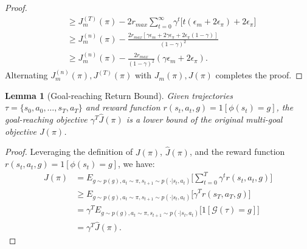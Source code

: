 \documentclass{article}
\newtheorem{lemma}{Lemma}
\begin{document}
\begin{proof}
\begin{equation*}
\begin{aligned}
    &\geq J^{(T)}_m(\pi) - 2r_{max}\sum_{t=0}^{\infty} \gamma^t\big[ t(\epsilon_m +2\epsilon_{\pi}) + 2\epsilon_{\pi} \big] \\
    &\geq J^{(n)}_m(\pi) - \frac{2 r_{max}[\gamma\epsilon_m + 2 \gamma \epsilon_{\pi}+2\epsilon_{\pi}(1-\gamma)]}{(1-\gamma)^2} \\
    &\geq J_m^{(n)}(\pi) - \frac{2r_{max}}{(1-\gamma)^2} ( \gamma \epsilon_m + 2\epsilon_{\pi}  ).
    \end{aligned}
    \end{equation*}
    Alternating $J_m^{(n)}(\pi), J^{(T)}(\pi)$ with $J_m(\pi), J(\pi)$ completes the proof.
\end{proof}

\begin{lemma}[Goal-reaching Return Bound]
\label{lemma1}
    Given trajectories $\tau = \{s_0,a_0,\ldots, s_T, a_T\}$ and reward function $r(s_t,a_t,g) = 1[\phi(s_t) = g]$, the goal-reaching objective $\gamma^T\hat J(\pi)$ is a lower bound of the original multi-goal objective $J(\pi)$.
\end{lemma}
\begin{proof}
    Leveraging the definition of $J(\pi)$, $\hat J(\pi)$, and the reward function $r(s_t,a_t,g) = 1[\phi(s_t) = g]$, we have:
    \begin{equation*}
    \begin{aligned}
    J(\pi)&=E_{g\sim p(g),a_t \sim \pi, s_{t+1}\sim p(\cdot|s_t,a_t)}\big[\sum^{T}_{t=0} \gamma^t r(s_t, a_t, g) \big] \\
    & \geq E_{g\sim p(g),a_t \sim \pi, s_{t+1}\sim p(\cdot|s_t,a_t)}\big[\gamma^T r(s_T, a_T, g) \big] \\
    & = \gamma^T E_{g\sim p(g),a_t \sim \pi, s_{t+1}\sim p(\cdot|s_t,a_t)}\big[1[\mathcal{G}(\tau) = g] \big] \\
    & = \gamma^T \hat J(\pi).
    \end{aligned}
    \end{equation*}
\end{proof}

\end{document}
